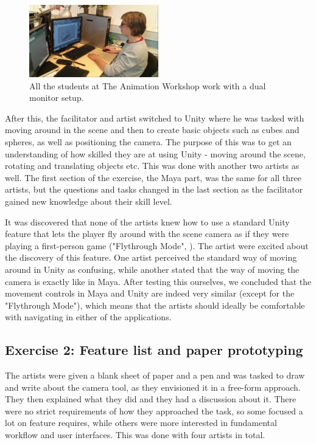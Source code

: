\begin{figure}[htbp]
\centering
\includegraphics[width=0.50\textwidth]{Pics/Mads_dual}
\caption{All the students at The Animation Workshop work with a dual monitor setup.}
\label{fig:mads_dual}
\end{figure}

After this, the facilitator and artist switched to Unity where he was tasked with moving around in the scene and then to create basic objects such as cubes and spheres, as well as positioning the camera. The purpose of this was to get an understanding of how skilled they are at using Unity - moving around the scene, rotating and translating objects etc. This was done with another two artists as well. The first section of the exercise, the Maya part, was the same for all three artists, but the questions and tasks changed in the last section as the facilitator gained new knowledge about their skill level.

It was discovered that none of the artists knew how to use a standard Unity feature that lets the player fly around with the scene camera as if they were playing a first-person game ("Flythrough Mode", \cite{unity_flyMode}). The artist were excited about the discovery of this feature. One artist perceived the standard way of moving around in Unity as confusing, while another stated that the way of moving the camera is exactly like in Maya. After testing this ourselves, we concluded that the movement controls in Maya and Unity are indeed very similar (except for the "Flythrough Mode"), which means that the artists should ideally be comfortable with navigating in either of the applications.

\subsection{Exercise 2: Feature list and paper prototyping}
The artists were given a blank sheet of paper and a pen and was tasked to draw and write about the camera tool, as they envisioned it in a free-form approach. They then explained what they did and they had a discussion about it. There were no strict requirements of how they approached the task, so some focused a lot on feature requires, while others were more interested in fundamental workflow and user interfaces. This was done with four artists in total.

